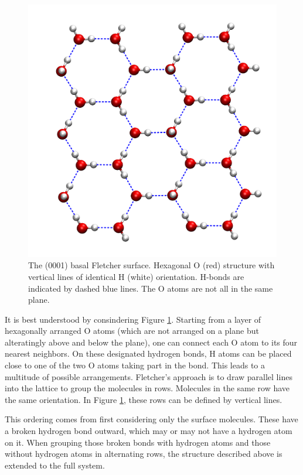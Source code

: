 \begin{figure}[t]
\centering
\includegraphics[width=.8\textwidth]{./img/FletcherAboveGlossyNoCueing.png}
\caption{The (0001) basal Fletcher surface. Hexagonal O (red) structure with
vertical lines of identical H (white) orientation. H-bonds are indicated by dashed blue lines.
The O atoms are not all in the same plane.}
\label{Fig:Ads:Fletcher}
\end{figure}

It is best understood by consindering Figure \ref{Fig:Ads:Fletcher}. Starting
from a layer of hexagonally arranged O atoms (which are not arranged on a plane but 
alteratingly above and below the plane), one can connect each O atom to its
four nearest neighbors. On these designated hydrogen bonds, H atoms can be placed close
to one of the two O atoms taking part in the bond. This leads to a multitude
of possible arrangements. Fletcher's approach is to draw parallel
lines into the lattice to group the molecules in rows. Molecules in the
same row have the same orientation. In Figure \ref{Fig:Ads:Fletcher}, these
rows can be defined by vertical lines.

This ordering comes from first considering only the surface molecules. These
have a broken hydrogen bond outward, which may or may not have a hydrogen
atom on it. When grouping those broken bonds with hydrogen atoms and those
without hydrogen atoms in alternating rows, the structure described above is
extended to the full system.

